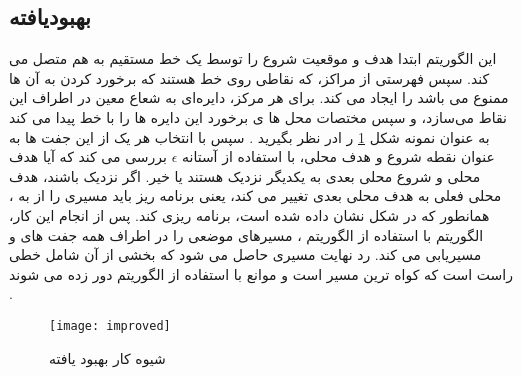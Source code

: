 
\subsection{بهبودیافته}
این الگوریتم ابتدا هدف و موقعیت شروع را توسط یک خط مستقیم به هم متصل می کند. سپس فهرستی از مراکز، که نقاطی روی خط هستند که برخورد کردن به آن ها ممنوع می باشد را  ایجاد می کند. برای هر مرکز، دایره‌ای به شعاع معین  
در اطراف این نقاط می‌سازد، و سپس مختصات محل ها ی برخورد این دایره ها را با خط پیدا می کند به عنوان نمونه شکل 
\ref{improved}
ر ادر نظر بگیرید . سپس با انتخاب هر یک از این جفت ها به عنوان نقطه شروع و هدف محلی، با استفاده از آستانه
$\epsilon$
بررسی می کند که آیا هدف محلی 
و شروع محلی بعدی 
به یکدیگر نزدیک هستند یا خیر. اگر نزدیک باشند، هدف محلی فعلی به هدف محلی بعدی تغییر می کند، یعنی برنامه ریز باید مسیری را از 
به
، همانطور که در شکل نشان داده شده است، برنامه ریزی کند. پس از انجام این کار، الگوریتم با استفاده از الگوریتم 
، مسیرهای موضعی را در اطراف همه جفت های 
و 
مسیریابی می کند.  رد نهایت مسیری حاصل می شود که بخشی از آن شامل خطی راست است که کواه ترین مسیر است و موانع با استفاده از الگوریتم
دور زده می شوند .

\begin{figure}[h]
	\texttt{[image: improved]}
	\centering
	\caption{ شیوه کار  بهبود یافته}
	\cite{paliwal2023survey}
	\label{improved}
\end{figure}